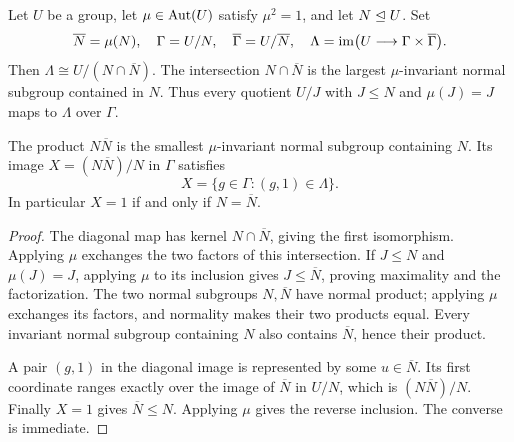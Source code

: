 \begin{theorem}\label{thm:mirror}
Let $U$ be a group, let $\mu\in\operatorname{Aut}(U)$ satisfy $\mu^2=1$, and let $N\mathrel{\unlhd} U$. Set
\[
 \overline N=\mu(N),\quad \Gamma=U/N,\quad
 \overline\Gamma=U/\overline N,\quad
 \Lambda=\operatorname{im}\bigl(U\longrightarrow\Gamma\times\overline\Gamma\bigr).
\]
Then $\Lambda\cong U/(N\cap\overline N)$. The intersection $N\cap\overline N$ is the largest $\mu$-invariant normal subgroup contained in $N$. Thus every quotient $U/J$ with $J\leq N$ and $\mu(J)=J$ maps to $\Lambda$ over $\Gamma$.

The product $N\overline N$ is the smallest $\mu$-invariant normal subgroup containing $N$. Its image $X=(N\overline N)/N$ in $\Gamma$ satisfies
\begin{equation}\label{eq:chiralitykernel}
                X=\{g\in\Gamma:(g,1)\in\Lambda\}.
\end{equation}
In particular $X=1$ if and only if $N=\overline N$.
\end{theorem}
\begin{proof}
The diagonal map has kernel $N\cap\overline N$, giving the first isomorphism. Applying $\mu$ exchanges the two factors of this intersection. If $J\leq N$ and $\mu(J)=J$, applying $\mu$ to its inclusion gives $J\leq\overline N$, proving maximality and the factorization. The two normal subgroups $N,\overline N$ have normal product; applying $\mu$ exchanges its factors, and normality makes their two products equal. Every invariant normal subgroup containing $N$ also contains $\overline N$, hence their product.

A pair $(g,1)$ in the diagonal image is represented by some $u\in\overline N$. Its first coordinate ranges exactly over the image of $\overline N$ in $U/N$, which is $(N\overline N)/N$. Finally $X=1$ gives $\overline N\leq N$. Applying $\mu$ gives the reverse inclusion. The converse is immediate.
\end{proof}

